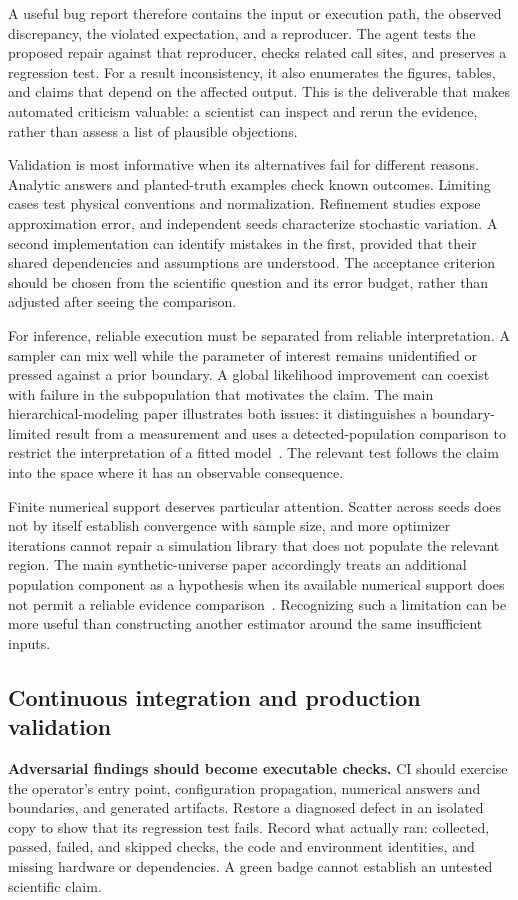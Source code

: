 \documentclass[aps,prd,reprint,nofootinbib]{revtex4-2}
\begin{document}
A useful bug report therefore contains the input or execution path, the observed discrepancy, the violated expectation, and a reproducer. The agent tests the proposed repair against that reproducer, checks related call sites, and preserves a regression test. For a result inconsistency, it also enumerates the figures, tables, and claims that depend on the affected output. This is the deliverable that makes automated criticism valuable: a scientist can inspect and rerun the evidence, rather than assess a list of plausible objections.

Validation is most informative when its alternatives fail for different reasons. Analytic answers and planted-truth examples check known outcomes. Limiting cases test physical conventions and normalization. Refinement studies expose approximation error, and independent seeds characterize stochastic variation. A second implementation can identify mistakes in the first, provided that their shared dependencies and assumptions are understood. The acceptance criterion should be chosen from the scientific question and its error budget, rather than adjusted after seeing the comparison.

For inference, reliable execution must be separated from reliable interpretation. A sampler can mix well while the parameter of interest remains unidentified or pressed against a prior boundary. A global likelihood improvement can coexist with failure in the subpopulation that motivates the claim. The main hierarchical-modeling paper illustrates both issues: it distinguishes a boundary-limited result from a measurement and uses a detected-population comparison to restrict the interpretation of a fitted model~\cite{HierarchicalMethods}. The relevant test follows the claim into the space where it has an observable consequence.

Finite numerical support deserves particular attention. Scatter across seeds does not by itself establish convergence with sample size, and more optimizer iterations cannot repair a simulation library that does not populate the relevant region. The main synthetic-universe paper accordingly treats an additional population component as a hypothesis when its available numerical support does not permit a reliable evidence comparison~\cite{SyntheticUniverses}. Recognizing such a limitation can be more useful than constructing another estimator around the same insufficient inputs.

\subsection{Continuous integration and production validation}
\textbf{Adversarial findings should become executable checks.} CI should exercise the operator's entry point, configuration propagation, numerical answers and boundaries, and generated artifacts. Restore a diagnosed defect in an isolated copy to show that its regression test fails. Record what actually ran: collected, passed, failed, and skipped checks, the code and environment identities, and missing hardware or dependencies. A green badge cannot establish an untested scientific claim.
\end{document}
